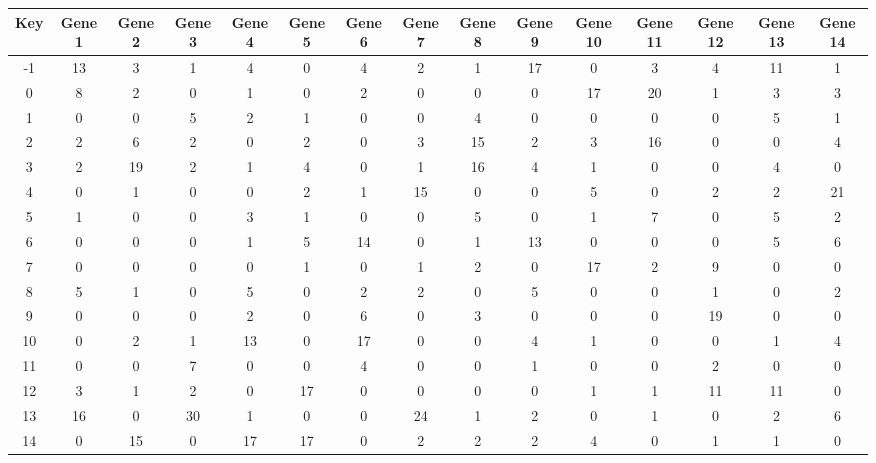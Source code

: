 \begin{tabular}{|c|c|c|c|c|c|c|c|c|c|c|c|c|c|c|}
\hline
Key & Gene 1 & Gene 2 & Gene 3 & Gene 4 & Gene 5 & Gene 6 & Gene 7 & Gene 8 & Gene 9 & Gene 10 & Gene 11 & Gene 12 & Gene 13 & Gene 14 \\
\hline
-1 & 13 & 3 & 1 & 4 & 0 & 4 & 2 & 1 & 17 & 0 & 3 & 4 & 11 & 1 \\
0 & 8 & 2 & 0 & 1 & 0 & 2 & 0 & 0 & 0 & 17 & 20 & 1 & 3 & 3 \\
1 & 0 & 0 & 5 & 2 & 1 & 0 & 0 & 4 & 0 & 0 & 0 & 0 & 5 & 1 \\
2 & 2 & 6 & 2 & 0 & 2 & 0 & 3 & 15 & 2 & 3 & 16 & 0 & 0 & 4 \\
3 & 2 & 19 & 2 & 1 & 4 & 0 & 1 & 16 & 4 & 1 & 0 & 0 & 4 & 0 \\
4 & 0 & 1 & 0 & 0 & 2 & 1 & 15 & 0 & 0 & 5 & 0 & 2 & 2 & 21 \\
5 & 1 & 0 & 0 & 3 & 1 & 0 & 0 & 5 & 0 & 1 & 7 & 0 & 5 & 2 \\
6 & 0 & 0 & 0 & 1 & 5 & 14 & 0 & 1 & 13 & 0 & 0 & 0 & 5 & 6 \\
7 & 0 & 0 & 0 & 0 & 1 & 0 & 1 & 2 & 0 & 17 & 2 & 9 & 0 & 0 \\
8 & 5 & 1 & 0 & 5 & 0 & 2 & 2 & 0 & 5 & 0 & 0 & 1 & 0 & 2 \\
9 & 0 & 0 & 0 & 2 & 0 & 6 & 0 & 3 & 0 & 0 & 0 & 19 & 0 & 0 \\
10 & 0 & 2 & 1 & 13 & 0 & 17 & 0 & 0 & 4 & 1 & 0 & 0 & 1 & 4 \\
11 & 0 & 0 & 7 & 0 & 0 & 4 & 0 & 0 & 1 & 0 & 0 & 2 & 0 & 0 \\
12 & 3 & 1 & 2 & 0 & 17 & 0 & 0 & 0 & 0 & 1 & 1 & 11 & 11 & 0 \\
13 & 16 & 0 & 30 & 1 & 0 & 0 & 24 & 1 & 2 & 0 & 1 & 0 & 2 & 6 \\
14 & 0 & 15 & 0 & 17 & 17 & 0 & 2 & 2 & 2 & 4 & 0 & 1 & 1 & 0 \\
\hline
\end{tabular}